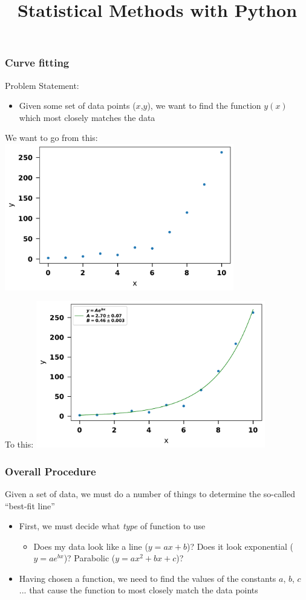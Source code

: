 \documentclass{beamer}
\title{Statistical Methods with Python}
\date{}
\begin{document}
	
	\frame{\titlepage}
	
	\begin{frame}
		\frametitle{Curve fitting}
		Problem Statement:
		\begin{itemize}
			\item <1->Given some set of data points ($x$,$y$), we want to find the function $y(x)$ which most closely matches the data
		\end{itemize}
	\end{frame}

	\begin{frame}
		We want to go from this:
		\centering
		\includegraphics[width=10cm]{example_curve}
	\end{frame}

	\begin{frame}
		To this:
	\centering
	\includegraphics[width=10cm]{example_curve_fit}
	\end{frame}

	\begin{frame}
		\frametitle{Overall Procedure}
		Given a set of data, we must do a number of things to determine the so-called ``best-fit line''
		\begin{itemize}
			\item First, we must decide what \textit{type} of function to use
			\begin{itemize}
				\item Does my data look like a line ($y=ax+b$)? Does it look exponential ($y=ae^{bx}$)? Parabolic ($y=ax^2+bx+c$)?
			\end{itemize}
			\item <2->Having chosen a function, we need to find the values of the constants $a$, $b$, $c$ ... that cause the function to most closely match the data points
		\end{itemize}
	\end{frame}
\end{document}
